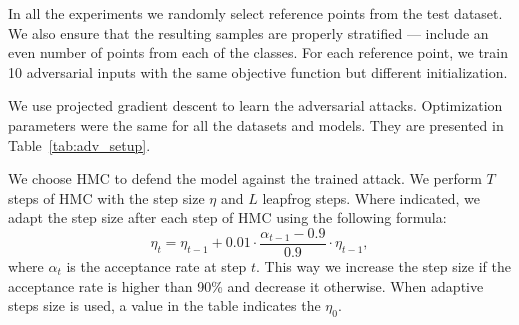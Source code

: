 In all the experiments we randomly select reference points from the test dataset. We also ensure that the resulting samples are properly stratified --- include an even number of points from each of the classes. For each reference point, we train 10 adversarial inputs with the same objective function but different initialization. 

We use projected gradient descent to learn the adversarial attacks. Optimization parameters were the same for all the datasets and models. They are presented in Table~\ref{tab:adv_setup}.

We choose HMC to defend the model against the trained attack. We perform $T$ steps of HMC with the step size $\eta$ and $L$ leapfrog steps. Where indicated, we adapt the step size after each step of HMC using the following formula:
\begin{equation}
    \eta_t = \eta_{t-1} + 0.01\cdot\frac{\alpha_{t-1} - 0.9}{0.9}\cdot\eta_{t-1},
\end{equation}
where $\alpha_t$ is the acceptance rate at step $t$. This way we increase the step size if the acceptance rate is higher than 90\% and decrease it otherwise. When adaptive steps size is used, a value in the table indicates the $\eta_0$.

